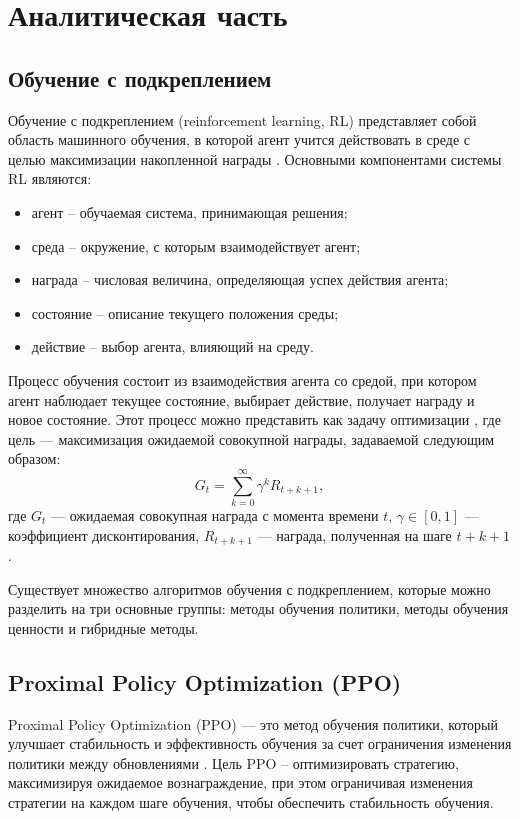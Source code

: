 \chapter{Аналитическая часть}

\section{Обучение с подкреплением}
Обучение с подкреплением (reinforcement learning, RL) представляет собой область машинного обучения, 
в которой агент учится действовать в среде с целью максимизации накопленной награды \cite{lib:rl}. 
Основными компонентами системы RL являются:
\begin{itemize}
    \item агент -- обучаемая система, принимающая решения;
    \item среда -- окружение, с которым взаимодействует агент;
    \item награда -- числовая величина, определяющая успех действия агента;
    \item состояние -- описание текущего положения среды;
    \item действие -- выбор агента, влияющий на среду.
\end{itemize}

Процесс обучения состоит из взаимодействия агента со средой, при котором агент наблюдает текущее состояние, 
выбирает действие, получает награду и новое состояние. 
Этот процесс можно представить как задачу оптимизации \cite{lib:rl}, где цель — максимизация ожидаемой совокупной награды, задаваемой следующим образом:
\begin{equation}
G_t = \sum_{k=0}^\infty \gamma^k R_{t+k+1},
\end{equation}
где $G_t$ — ожидаемая совокупная награда с момента времени $t$, $\gamma \in [0, 1]$ — коэффициент дисконтирования, $R_{t+k+1}$ — награда, полученная на шаге $t+k+1$.

Существует множество алгоритмов обучения с подкреплением, которые можно разделить на три основные группы: 
методы обучения политики, методы обучения ценности и гибридные методы. 

\section{Proximal Policy Optimization (PPO)}
Proximal Policy Optimization (PPO) — это метод обучения политики, который улучшает стабильность и эффективность 
обучения за счет ограничения изменения политики между обновлениями \cite{lib:rlmethods}. 
Цель PPO -- оптимизировать стратегию, максимизируя ожидаемое вознаграждение, при этом
ограничивая изменения стратегии на каждом шаге обучения, чтобы обеспечить стабильность обучения. 

